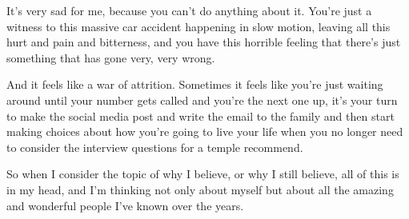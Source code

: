\begin{compactitem}
\begin{compactitem}
					\item It's very sad for me, because you can't do anything about it. You're just a witness to this massive car accident happening in slow motion, leaving all this hurt and pain and bitterness, and you have this horrible feeling that there's just something that has gone very, very wrong.
					\item And it feels like a war of attrition. Sometimes it feels like you're just waiting around until your number gets called and you're the next one up, it's your turn to make the social media post and write the email to the family and then start making choices about how you're going to live your life when you no longer need to consider the interview questions for a temple recommend.
					\item So when I consider the topic of why I believe, or why I still believe, all of this is in my head, and I'm thinking not only about myself but about all the amazing and wonderful people I've known over the years.
				\end{compactitem}
				

\end{compactitem}
